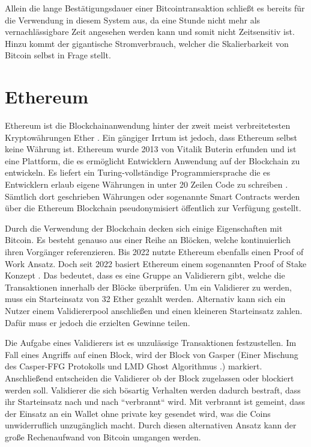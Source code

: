 \documentclass[11pt,a4paper]{scrreprt}
\begin{document}
Allein die lange Bestätigungsdauer einer Bitcointransaktion schließt es bereits für die Verwendung in diesem System aus, da eine Stunde nicht mehr als vernachlässigbare Zeit angesehen werden kann und somit nicht Zeitsensitiv ist. Hinzu kommt der gigantische Stromverbrauch, welcher die Skalierbarkeit von Bitcoin selbst in Frage stellt. 


\section{Ethereum}
\label{sec:ethereum}
Ethereum ist die Blockchainanwendung hinter der zweit meist verbreitetesten Kryptowährungen Ether \cite{eth-marketCapitalisation}. Ein gängiger Irrtum ist jedoch, dass Ethereum selbst keine Währung ist. Ethereum wurde 2013 von Vitalik Buterin erfunden und ist eine Plattform, die es ermöglicht Entwicklern Anwendung auf der Blockchain zu entwickeln. Es liefert ein Turing-vollständige Programmiersprache die es Entwicklern erlaub eigene Währungen in unter 20 Zeilen Code zu schreiben \cite{eth-buterin2013ethereum}. Sämtlich dort geschrieben Währungen oder sogenannte Smart Contracts werden über die Ethereum Blockchain pseudonymisiert öffentlich zur Verfügung gestellt. 

Durch die Verwendung der Blockchain decken sich einige Eigenschaften mit Bitcoin. Es besteht genauso aus einer Reihe an Blöcken, welche kontinuierlich ihren Vorgänger referenzieren. Bis 2022 nutzte Ethereum ebenfalls einen Proof of Work Ansatz. Doch seit 2022 basiert Ethereum einem sogenannten Proof of Stake Konzept \cite{eth-explainerInvestopia}. Das bedeutet, dass es eine Gruppe an Validierern gibt, welche die Transaktionen innerhalb der Blöcke überprüfen. Um ein Validierer zu werden, muss ein Starteinsatz von 32 Ether gezahlt werden. Alternativ kann sich ein Nutzer einem Validiererpool anschließen und einen kleineren Starteinsatz zahlen. Dafür muss er jedoch die erzielten Gewinne teilen. 

Die Aufgabe eines Validierers ist es unzulässige Transaktionen festzustellen. Im Fall eines Angriffs auf einen Block, wird der Block von Gasper (Einer Mischung des Casper-FFG Protokolls und LMD Ghost Algorithmus \cite{eth-buterin2020combining}.) markiert. Anschließend entscheiden die Validierer ob der Block zugelassen oder blockiert werden soll. Validierer die sich bösartig Verhalten werden dadurch bestraft, dass ihr Starteinsatz nach und nach ``verbrannt`` wird. Mit verbrannt ist gemeint, dass der Einsatz an ein Wallet ohne private key gesendet wird, was die Coins unwiderruflich unzugänglich macht. Durch diesen alternativen Ansatz kann der große Rechenaufwand von Bitcoin umgangen werden.\\
\end{document}

